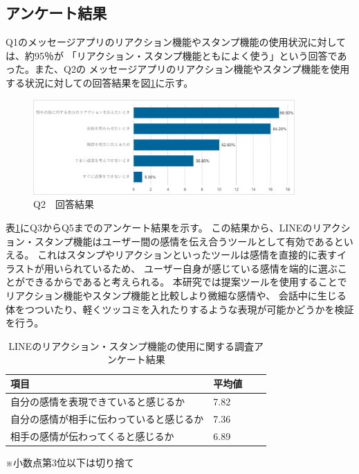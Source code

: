 \documentclass[11pt,a4paper]{ltjsreport}
\newcommand{\bhline}{\noalign{\hrule height 1.2pt}} %
\begin{document}
\subsection{アンケート結果}
Q1のメッセージアプリのリアクション機能やスタンプ機能の使用状況に対しては、約95％が
「リアクション・スタンプ機能ともによく使う」という回答であった。また、Q2の
メッセージアプリのリアクション機能やスタンプ機能を使用する状況に対しての回答結果を図\ref{figure:graph1}に示す。

\vspace{\baselineskip} %
\begin{figure}[htbp]
    \begin{center}
        \includegraphics[width=100mm]{PDF/graph_1.png}
        \caption{Q2　回答結果}
        \label{figure:graph1}
    \end{center}
\end{figure}


表\ref{table:Yobi_tyousa_kekka}にQ3からQ5までのアンケート結果を示す。
この結果から、LINEのリアクション・スタンプ機能はユーザー間の感情を伝え合うツールとして有効であるといえる。
これはスタンプやリアクションといったツールは感情を直接的に表すイラストが用いられているため、
ユーザー自身が感じている感情を端的に選ぶことができるからであると考えられる。
本研究では提案ツールを使用することでリアクション機能やスタンプ機能と比較しより微細な感情や、
会話中に生じる体をつついたり、軽くツッコミを入れたりするような表現が可能かどうかを検証を行う。

\vspace{\baselineskip} %
\begin{table}[!ph]
    \caption{LINEのリアクション・スタンプ機能の使用に関する調査アンケート結果}
    \label{table:Yobi_tyousa_kekka}
    \vspace{5mm}
    \centering
    \begin{tabular}{llll}
        \bhline
        項目                   &平均値  \\
        \hline
        自分の感情を表現できていると感じるか   & 7.82 \\
        自分の感情が相手に伝わっていると感じるか & 7.36 \\
        相手の感情が伝わってくると感じるか    & 6.89 \\
        \hline
    \end{tabular}
    \vspace{1cm} %
    \parbox{0.55\textwidth}{\small ※小数点第3位以下は切り捨て}
\end{table}
\end{document}
